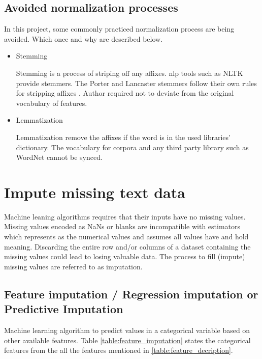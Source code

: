   \subsection{Avoided normalization processes}

  In this project, some commonly practiced normalization process are being avoided. Which once and why are described below.

  \begin{itemize}
      \item Stemming 
      
      Stemming is a process of striping off any affixes. \acl{nlp} tools such as NLTK provide stemmers. The Porter and Lancaster
      stemmers follow their own rules for stripping affixes \parencite{BirdKleinLoper09}. Author required not to deviate from the original vocabulary of features.

      \item Lemmatization
      
      Lemmatization remove the affixes if the word is in the used libraries' dictionary. The vocabulary for corpora and any third party library such as WordNet cannot be synced.   

  \end{itemize}



\section{Impute missing text data} \label{ch:data-imputation}

Machine leaning algorithms requires that their inputs have no missing values.
Missing values encoded as NaNs or blanks are incompatible with estimators which represents as the numerical values and assumes all values have and hold meaning. Discarding the entire row and/or columns of a dataset containing the missing values could lead to losing valuable data. The process to fill (impute) missing values are referred to as imputation.

\subsection{Feature imputation / Regression imputation or \\ Predictive Imputation}

Machine learning algorithm to predict values in a categorical variable based on other available features. Table \ref{table:feature_imputation} states the categorical features from the all the features mentioned in \ref{table:feature_decription}.


